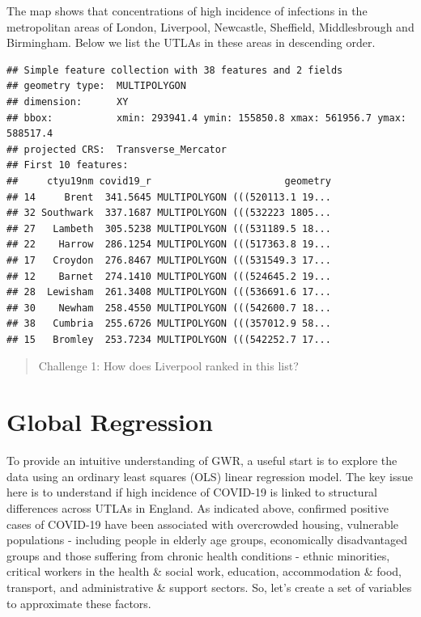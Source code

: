 \documentclass[
]{book}
\newenvironment{Shaded}{\begin{snugshade}}{\end{snugshade}}
\newcommand{\DecValTok}[1]{\textcolor[rgb]{0.00,0.00,0.81}{#1}}
\newcommand{\FunctionTok}[1]{\textcolor[rgb]{0.00,0.00,0.00}{#1}}
\newcommand{\NormalTok}[1]{#1}
\newcommand{\OtherTok}[1]{\textcolor[rgb]{0.56,0.35,0.01}{#1}}
\newcommand{\SpecialCharTok}[1]{\textcolor[rgb]{0.00,0.00,0.00}{#1}}
\begin{document}
The map shows that concentrations of high incidence of infections in the metropolitan areas of London, Liverpool, Newcastle, Sheffield, Middlesbrough and Birmingham. Below we list the UTLAs in these areas in descending order.

\begin{Shaded}
\end{Shaded}

\begin{verbatim}
## Simple feature collection with 38 features and 2 fields
## geometry type:  MULTIPOLYGON
## dimension:      XY
## bbox:           xmin: 293941.4 ymin: 155850.8 xmax: 561956.7 ymax: 588517.4
## projected CRS:  Transverse_Mercator
## First 10 features:
##     ctyu19nm covid19_r                       geometry
## 14     Brent  341.5645 MULTIPOLYGON (((520113.1 19...
## 32 Southwark  337.1687 MULTIPOLYGON (((532223 1805...
## 27   Lambeth  305.5238 MULTIPOLYGON (((531189.5 18...
## 22    Harrow  286.1254 MULTIPOLYGON (((517363.8 19...
## 17   Croydon  276.8467 MULTIPOLYGON (((531549.3 17...
## 12    Barnet  274.1410 MULTIPOLYGON (((524645.2 19...
## 28  Lewisham  261.3408 MULTIPOLYGON (((536691.6 17...
## 30    Newham  258.4550 MULTIPOLYGON (((542600.7 18...
## 38   Cumbria  255.6726 MULTIPOLYGON (((357012.9 58...
## 15   Bromley  253.7234 MULTIPOLYGON (((542252.7 17...
\end{verbatim}

\begin{quote}
Challenge 1:
How does Liverpool ranked in this list?
\end{quote}

\hypertarget{global-regression}{%
\section{Global Regression}\label{global-regression}}

To provide an intuitive understanding of GWR, a useful start is to explore the data using an ordinary least squares (OLS) linear regression model. The key issue here is to understand if high incidence of COVID-19 is linked to structural differences across UTLAs in England. As indicated above, confirmed positive cases of COVID-19 have been associated with overcrowded housing, vulnerable populations - including people in elderly age groups, economically disadvantaged groups and those suffering from chronic health conditions - ethnic minorities, critical workers in the health \& social work, education, accommodation \& food, transport, and administrative \& support sectors. So, let's create a set of variables to approximate these factors.
\end{document}
